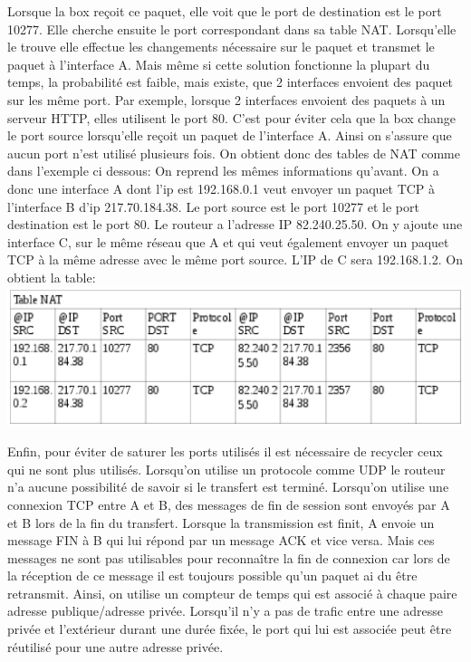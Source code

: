 Lorsque la box reçoit ce paquet, elle voit que le port de destination est le
port 10277. Elle cherche ensuite le port correspondant dans sa table NAT.
Lorsqu'elle le trouve elle effectue les changements nécessaire sur le paquet et
transmet le paquet à l'interface A.
\newline
Mais même si cette solution fonctionne la plupart du temps, la probabilité est
faible, mais existe, que 2 interfaces envoient des paquet sur les même port. Par exemple,
lorsque 2 interfaces envoient des paquets à un serveur HTTP, elles utilisent le port 80. 
C'est pour éviter cela que la box change le port source lorsqu'elle reçoit un paquet de
l'interface A. Ainsi on s'assure que aucun port n'est utilisé plusieurs fois.
On obtient donc des tables de NAT comme dans l'exemple ci dessous:
\newline
On reprend les mêmes informations qu'avant. On a donc une interface A dont l'ip
est 192.168.0.1 veut envoyer un paquet TCP à l'interface B d'ip 217.70.184.38.
Le port source est le port 10277 et le port destination est le port 80. Le
routeur a l'adresse IP  82.240.25.50.
On y ajoute une interface C, sur le même réseau que A et qui veut également
envoyer un paquet TCP à la même adresse avec le même port source. L'IP de C
sera 192.168.1.2.
On obtient la table:
\includegraphics{./pics/TableNAT2.eps}

Enfin, pour éviter de saturer les ports utilisés il est nécessaire de recycler
 ceux qui ne sont plus utilisés. Lorsqu'on utilise un protocole comme UDP le
routeur n'a aucune possibilité de savoir si le transfert est terminé. Lorsqu'on
utilise une connexion TCP entre A et B, des messages de fin de session sont
envoyés par A et B lors de la fin du transfert. Lorsque la transmission est
finit, A envoie un message FIN à B qui lui répond par un message ACK et vice
versa. Mais ces messages ne sont pas utilisables pour reconnaître la fin de
connexion car lors de la réception de ce message il est toujours possible qu'un
paquet ai du être retransmit. Ainsi, on utilise un compteur de temps qui est
associé à chaque paire adresse publique/adresse privée. Lorsqu'il n'y a pas de
trafic entre une adresse privée et l'extérieur durant une durée fixée, le port
qui lui est associée peut être réutilisé pour une autre adresse privée.

